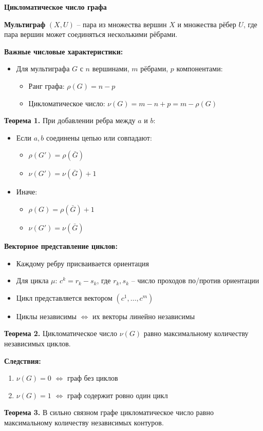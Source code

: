 \textbf{Цикломатическое число графа}

\noindent\textbf{Мультиграф} $(X,U)$ -- пара из множества вершин $X$ и множества рёбер $U$, где пара вершин может соединяться несколькими рёбрами.

\noindent\textbf{Важные числовые характеристики:}
\begin{itemize}
    \item Для мультиграфа $G$ с $n$ вершинами, $m$ рёбрами, $p$ компонентами:
    \begin{itemize}
        \item Ранг графа: $\rho(G) = n - p$
        \item Цикломатическое число: $\nu(G) = m - n + p = m - \rho(G)$
    \end{itemize}
\end{itemize}

\noindent\textbf{Теорема 1.} При добавлении ребра между $a$ и $b$:
\begin{itemize}
    \item Если $a,b$ соединены цепью или совпадают:
    \begin{itemize}
        \item $\rho(G') = \rho(\bar{G})$
        \item $\nu(G') = \nu(\bar{G}) + 1$
    \end{itemize}
    \item Иначе:
    \begin{itemize}
        \item $\rho(G) = \rho(\bar{G}) + 1$
        \item $\nu(G') = \nu(\bar{G})$
    \end{itemize}
\end{itemize}

\noindent\textbf{Векторное представление циклов:}
\begin{itemize}
    \item Каждому ребру присваивается ориентация
    \item Для цикла $\mu$: $c^k = r_k - s_k$, где $r_k,s_k$ -- число проходов по/против ориентации
    \item Цикл представляется вектором $(c^1,\ldots,c^m)$
    \item Циклы независимы $\Leftrightarrow$ их векторы линейно независимы
\end{itemize}

\noindent\textbf{Теорема 2.} Цикломатическое число $\nu(G)$ равно максимальному количеству независимых циклов.

\noindent\textbf{Следствия:}
\begin{enumerate}
    \item $\nu(G)=0$ $\Leftrightarrow$ граф без циклов
    \item $\nu(G)=1$ $\Leftrightarrow$ граф содержит ровно один цикл
\end{enumerate}

\noindent\textbf{Теорема 3.} В сильно связном графе цикломатическое число равно максимальному количеству независимых контуров.